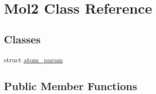 \hypertarget{classMol2}{
\section{Mol2 Class Reference}
\label{classMol2}
}
\subsection*{Classes}
\begin{DoxyCompactItemize}
\item 
struct \hyperlink{structMol2_1_1atom__param}{atom\_\-param}
\end{DoxyCompactItemize}
\subsection*{Public Member Functions}
